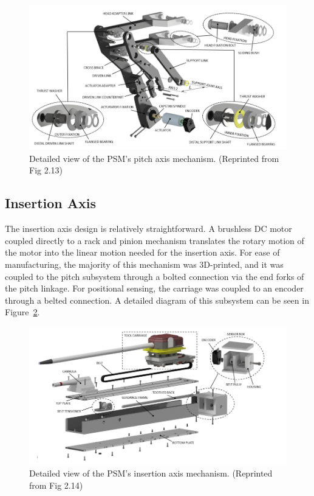 \begin{figure}[H]
    \centering
    \includegraphics[width=1.0\linewidth]{figures/pitch_detailed.png}
    \caption{Detailed view of the PSM's pitch axis mechanism. (Reprinted from \cite{walder2022design} Fig 2.13)}
    \label{fig:pitch_detailed}
\end{figure}

\subsection{Insertion Axis}

The insertion axis design is relatively straightforward. A brushless DC motor coupled directly to a rack and pinion mechanism translates the rotary motion of the motor into the linear motion needed for the insertion axis. For ease of manufacturing, the majority of this mechanism was 3D-printed, and it was coupled to the pitch subsystem through a bolted connection via the end forks of the pitch linkage. For positional sensing, the carriage was coupled to an encoder through a belted connection. A detailed diagram of this subsystem can be seen in Figure~\ref{fig:insertion_detailed}.

\begin{figure}[H]
    \centering
    \includegraphics[width=1.0\linewidth]{figures/insertion_detailed.png}
    \caption{Detailed view of the PSM's insertion axis mechanism. (Reprinted from \cite{walder2022design} Fig 2.14)}
    \label{fig:insertion_detailed}
\end{figure}

